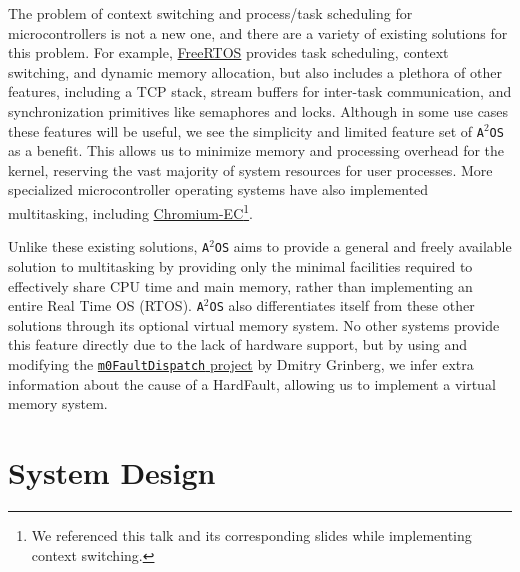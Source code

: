 \documentclass[12pt]{article}
\newcommand{\os}{\texttt{A$^2$OS} }
\begin{document}
The problem of context switching and process/task scheduling for
microcontrollers is not a new one, and there are a variety of existing solutions
for this problem. For example,
\href{https://www.freertos.org/Documentation/02-Kernel/02-Kernel-features/01-Tasks-and-co-routines/00-Tasks-and-co-routines#characteristics-of-a-task}{FreeRTOS}
provides task scheduling, context switching, and dynamic memory allocation, but
also includes a plethora of other features, including a TCP stack, stream
buffers for inter-task communication, and synchronization primitives like
semaphores and locks. Although in some use cases these features will be useful,
we see the simplicity and limited feature set of \os as a benefit. This allows
us to minimize memory and processing overhead for the kernel, reserving the vast
majority of system resources for user processes. More specialized
microcontroller operating systems have also implemented multitasking, including
\href{https://www.youtube.com/watch?v=yHqaspeGJRw}{Chromium-EC}\footnote{We
referenced this talk and its corresponding slides while implementing context
switching.}.

Unlike these existing solutions, \os aims to provide a general and freely
available solution to multitasking by providing only the minimal facilities
required to effectively share CPU time and main memory, rather than implementing
an entire Real Time OS (RTOS). \os also differentiates itself from these other
solutions through its optional virtual memory system. No other systems provide
this feature directly due to the lack of hardware support, but by using and 
modifying the
\href{https://dmitry.gr/?r=05.Projects&proj=27.%20m0FaultDispatch}{\texttt{m0FaultDispatch} project}
by Dmitry Grinberg, we infer extra information about the cause of a
HardFault, allowing us to implement a virtual memory system.


\section{System Design}
\end{document}
